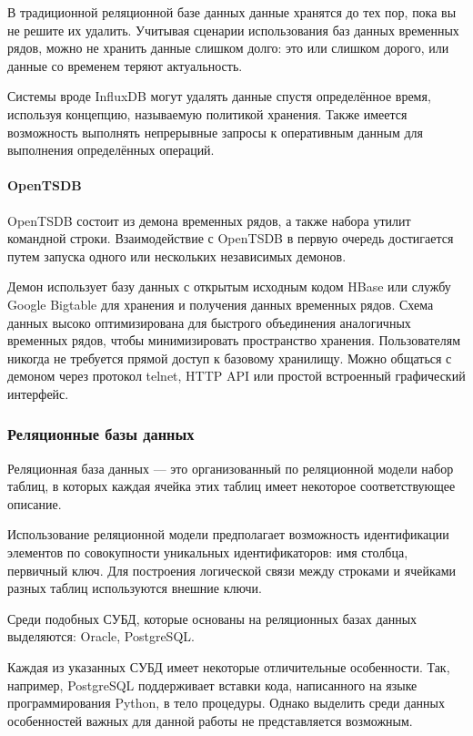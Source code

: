 В традиционной реляционной базе данных данные хранятся до тех пор, пока вы не решите их удалить. Учитывая сценарии использования баз данных временных рядов, можно не хранить данные слишком долго: это или слишком дорого, или данные со временем теряют актуальность. \cite{ryadi}

Системы вроде InfluxDB могут удалять данные спустя определённое время, используя концепцию, называемую политикой хранения. Также имеется возможность выполнять непрерывные запросы к оперативным данным для выполнения определённых операций. \cite{ryadi}

\paragraph{OpenTSDB}
OpenTSDB состоит из демона временных рядов, а также набора утилит командной строки. Взаимодействие с OpenTSDB в первую очередь достигается путем запуска одного или нескольких независимых демонов.

Демон использует базу данных с открытым исходным кодом HBase или службу Google Bigtable для хранения и получения данных временных рядов. Схема данных высоко оптимизирована для быстрого объединения аналогичных временных рядов, чтобы минимизировать пространство хранения. Пользователям никогда не требуется прямой доступ к базовому хранилищу. Можно общаться с демоном через протокол telnet, HTTP API или простой встроенный графический интерфейс.

\subsubsection{Реляционные базы данных}
Реляционная база данных --- это организованный по реляционной модели набор таблиц, в которых каждая ячейка этих таблиц имеет некоторое соответствующее описание. \cite{relationki}

Использование реляционной модели предполагает возможность идентификации элементов по совокупности уникальных идентификаторов: имя столбца, первичный ключ. Для построения логической связи между строками и ячейками разных таблиц используются внешние ключи. \cite{relationki}

Среди подобных СУБД, которые основаны на реляционных базах данных выделяются: Oracle, PostgreSQL.

Каждая из указанных СУБД имеет некоторые отличительные особенности. Так, например, PostgreSQL поддерживает вставки кода, написанного на языке программирования Python, в тело процедуры. Однако выделить среди данных особенностей важных для данной работы не представляется возможным.

